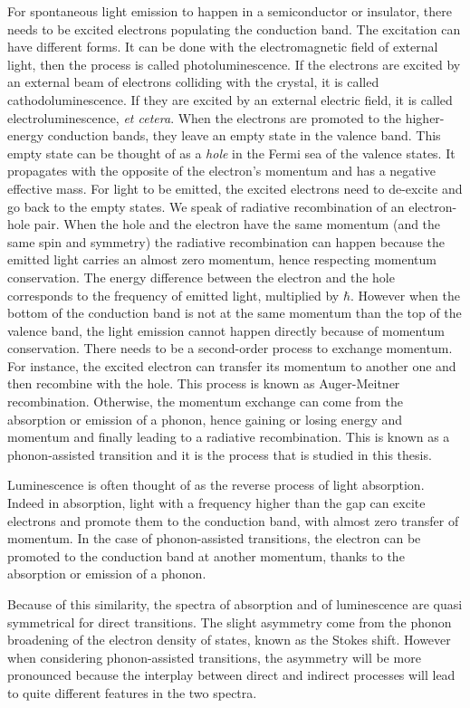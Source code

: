 For spontaneous light emission to happen in a semiconductor or insulator, there needs to be excited electrons populating the conduction band. The excitation can have different forms. It can be done with the electromagnetic field of external light, then the process is called photoluminescence. If the electrons are excited by an external beam of electrons colliding with the crystal, it is called cathodoluminescence. If they are excited by an external electric field, it is called electroluminescence, \textit{et cetera}. When the electrons are promoted to the higher-energy conduction bands, they leave an empty state in the valence band. This empty state can be thought of as a \textit{hole} in the Fermi sea of the valence states. It propagates with the opposite of the electron's momentum and has a negative effective mass. For light to be emitted, the excited electrons need to de-excite and go back to the empty states. We speak of radiative recombination of an electron-hole pair. When the hole and the electron have the same momentum (and the same spin and symmetry) the radiative recombination can happen because the emitted light carries an almost zero momentum, hence respecting momentum conservation. The energy difference between the electron and the hole corresponds to the frequency of emitted light, multiplied by $\hbar$. 
However when the bottom of the conduction band is not at the same momentum than the top of the valence band, the light emission cannot happen directly because of momentum conservation. There needs to be a second-order process to exchange momentum. For instance, the excited electron can transfer its momentum to another one and then recombine with the hole. This process is known as Auger-Meitner recombination.\cite{delaney2009auger} Otherwise, the momentum exchange can come from the absorption or emission of a phonon, hence gaining or losing energy and momentum and finally leading to a radiative recombination. This is known as a phonon-assisted transition and it is the process that is studied in this thesis. 

Luminescence is often thought of as the reverse process of light absorption. Indeed in absorption, light with a frequency higher than the gap can excite electrons and promote them to the conduction band, with almost zero transfer of momentum. In the case of phonon-assisted transitions, the electron can be promoted to the conduction band at another momentum, thanks to the absorption or emission of a phonon. 

Because of this similarity, the spectra of absorption and of luminescence are quasi symmetrical for direct transitions. The slight asymmetry come from the phonon broadening of the electron density of states, known as the Stokes shift. However when considering phonon-assisted transitions, the asymmetry will be more pronounced because the interplay between direct and indirect processes will lead to quite different features in the two spectra.

